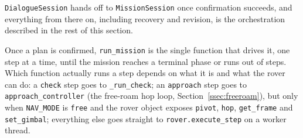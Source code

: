 \texttt{DialogueSession} hands off to \texttt{MissionSession} once
confirmation succeeds, and everything from there on, including recovery and
revision, is the orchestration described in the rest of this section.

\label{ssec:mission_loop}

Once a plan is confirmed, \texttt{run\_mission} is the single function that
drives it, one step at a time, until the mission reaches a terminal phase or
runs out of steps. Which function actually runs a step depends on what it is
and what the rover can do: a \texttt{check} step goes to
\texttt{\_run\_check}; an \texttt{approach} step goes to
\texttt{approach\_controller} (the free-roam hop loop,
Section~\ref{ssec:freeroam}), but only when \texttt{NAV\_MODE} is
\texttt{free} and the rover object exposes \texttt{pivot}, \texttt{hop},
\texttt{get\_frame} and \texttt{set\_gimbal}; everything else goes straight
to \texttt{rover.execute\_step} on a worker thread.

